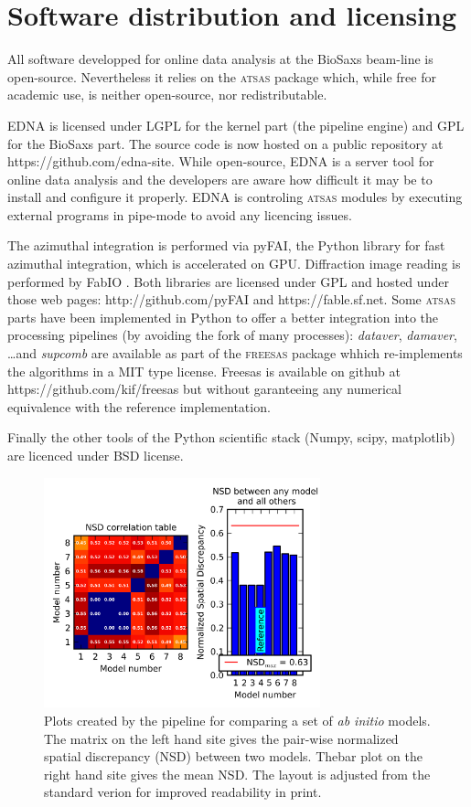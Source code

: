 \documentclass[preprint,pdf]{iucr}              %
\begin{document}
\appendix
\section{Software distribution and licensing}

All software developped for online data analysis at the BioSaxs beam-line is
open-source.
Nevertheless it relies on the \textsc{atsas} package which, while free for
academic use, is neither open-source, nor redistributable.

EDNA is licensed under LGPL for the kernel part (the pipeline engine) and GPL
for the BioSaxs part. The source code is now hosted on a public
repository at https://github.com/edna-site. While open-source, EDNA is a
server tool for online data analysis and the developers are aware how difficult
it may be to install and configure it properly. EDNA is controling
\textsc{atsas} modules by executing external programs in pipe-mode to avoid any
licencing issues.

The azimuthal integration is performed via pyFAI\cite{pyfai}, the Python library
for fast azimuthal integration, which is accelerated on GPU\cite{pyfai_gpu}.
Diffraction image reading is performed by FabIO \cite{fabio}.
Both libraries
are licensed under GPL and hosted under those web pages:
http://github.com/pyFAI and https://fable.sf.net.
Some \textsc{atsas} parts have been implemented in Python to offer a better
integration into the processing pipelines (by avoiding the fork of many
processes): \textit{dataver}, \textit{damaver}, \ldots  and \textit{supcomb}
are available as part of the \textsc{freesas} package whhich re-implements the
algorithms in a MIT type license. Freesas is available on github at
https://github.com/kif/freesas but without garanteeing any
numerical equivalence with the reference implementation.

Finally the other tools of the Python scientific stack (Numpy, scipy,
matplotlib) are licenced under BSD license.

\begin{figure}
\centering
\includegraphics[width=8cm]{nsd.png}%
\caption{Plots created by the pipeline for comparing a set of \textit{ab initio} models. The matrix on the left hand site gives the pair-wise normalized spatial discrepancy (NSD) between two models. Thebar plot on the right hand site gives the mean NSD. The layout is adjusted from the standard verion for improved readability in print.}
\label{fgr:nsd}
\end{figure}
\end{document}
